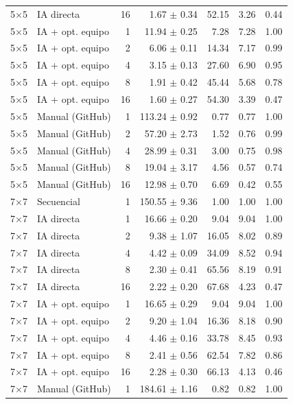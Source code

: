 \begin{tabular}{llrrrrr}
5$\times$5 & IA directa & 16 & 1.67 $\pm$ 0.34 & 52.15 & 3.26 & 0.44 \\
5$\times$5 & IA + opt. equipo & 1 & 11.94 $\pm$ 0.25 & 7.28 & 7.28 & 1.00 \\
5$\times$5 & IA + opt. equipo & 2 & 6.06 $\pm$ 0.11 & 14.34 & 7.17 & 0.99 \\
5$\times$5 & IA + opt. equipo & 4 & 3.15 $\pm$ 0.13 & 27.60 & 6.90 & 0.95 \\
5$\times$5 & IA + opt. equipo & 8 & 1.91 $\pm$ 0.42 & 45.44 & 5.68 & 0.78 \\
5$\times$5 & IA + opt. equipo & 16 & 1.60 $\pm$ 0.27 & 54.30 & 3.39 & 0.47 \\
5$\times$5 & Manual (GitHub) & 1 & 113.24 $\pm$ 0.92 & 0.77 & 0.77 & 1.00 \\
5$\times$5 & Manual (GitHub) & 2 & 57.20 $\pm$ 2.73 & 1.52 & 0.76 & 0.99 \\
5$\times$5 & Manual (GitHub) & 4 & 28.99 $\pm$ 0.31 & 3.00 & 0.75 & 0.98 \\
5$\times$5 & Manual (GitHub) & 8 & 19.04 $\pm$ 3.17 & 4.56 & 0.57 & 0.74 \\
5$\times$5 & Manual (GitHub) & 16 & 12.98 $\pm$ 0.70 & 6.69 & 0.42 & 0.55 \\
\midrule
7$\times$7 & Secuencial & 1 & 150.55 $\pm$ 9.36 & 1.00 & 1.00 & 1.00 \\
7$\times$7 & IA directa & 1 & 16.66 $\pm$ 0.20 & 9.04 & 9.04 & 1.00 \\
7$\times$7 & IA directa & 2 & 9.38 $\pm$ 1.07 & 16.05 & 8.02 & 0.89 \\
7$\times$7 & IA directa & 4 & 4.42 $\pm$ 0.09 & 34.09 & 8.52 & 0.94 \\
7$\times$7 & IA directa & 8 & 2.30 $\pm$ 0.41 & 65.56 & 8.19 & 0.91 \\
7$\times$7 & IA directa & 16 & 2.22 $\pm$ 0.20 & 67.68 & 4.23 & 0.47 \\
7$\times$7 & IA + opt. equipo & 1 & 16.65 $\pm$ 0.29 & 9.04 & 9.04 & 1.00 \\
7$\times$7 & IA + opt. equipo & 2 & 9.20 $\pm$ 1.04 & 16.36 & 8.18 & 0.90 \\
7$\times$7 & IA + opt. equipo & 4 & 4.46 $\pm$ 0.16 & 33.78 & 8.45 & 0.93 \\
7$\times$7 & IA + opt. equipo & 8 & 2.41 $\pm$ 0.56 & 62.54 & 7.82 & 0.86 \\
7$\times$7 & IA + opt. equipo & 16 & 2.28 $\pm$ 0.30 & 66.13 & 4.13 & 0.46 \\
7$\times$7 & Manual (GitHub) & 1 & 184.61 $\pm$ 1.16 & 0.82 & 0.82 & 1.00 \\

\end{tabular}

